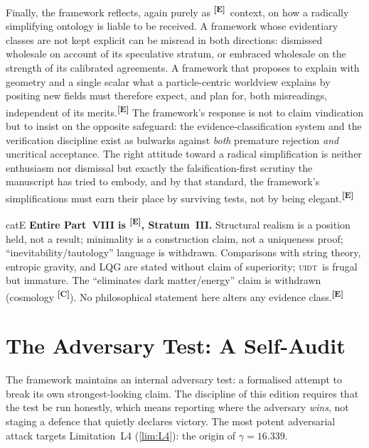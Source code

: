 \documentclass[12pt,a4paper,twoside]{article}
\theoremstyle{plain}
\theoremstyle{definition}
\theoremstyle{remark}
\newcommand{\UIDT}{\textsc{uidt}}
\newcommand{\catmark}[1]{\textsuperscript{\textsf{\textbf{[#1]}}}}
\newcommand{\GammaGeom}{16.339} %
\begin{document}
Finally, the framework reflects, again purely as \catmark{E}\ context, on how a radically simplifying ontology is liable to be received. A framework whose evidentiary classes are not kept explicit can be misread in both directions: dismissed wholesale on account of its speculative stratum, or embraced wholesale on the strength of its calibrated agreements. A framework that proposes to explain with geometry and a single scalar what a particle-centric worldview explains by positing new fields must therefore expect, and plan for, both misreadings, independent of its merits.\catmark{E} The framework's response is not to claim vindication but to insist on the opposite safeguard: the evidence-classification system and the verification discipline exist as bulwarks against \emph{both} premature rejection \emph{and} uncritical acceptance. The right attitude toward a radical simplification is neither enthusiasm nor dismissal but exactly the falsification-first scrutiny the manuscript has tried to embody, and by that standard, the framework's simplifications must earn their place by surviving tests, not by being elegant.\catmark{E}

\begin{evidencebox}{catE}
\textbf{Entire Part~VIII is \catmark{E}, Stratum~III.} Structural realism is a position held, not a result; minimality is a construction claim, not a uniqueness proof; ``inevitability/tautology'' language is withdrawn. Comparisons with string theory, entropic gravity, and LQG are stated without claim of superiority; \UIDT\ is frugal but immature. The ``eliminates dark matter/energy'' claim is withdrawn (cosmology \catmark{C}). No philosophical statement here alters any evidence class.\catmark{E}
\end{evidencebox}

\newpage
\section*{The Adversary Test: A Self-Audit}
\label{app:adversary}

\noindent The framework maintains an internal adversary test: a formalised attempt to break its own strongest-looking claim. The discipline of this edition requires that the test be run honestly, which means reporting where the adversary \emph{wins}, not staging a defence that quietly declares victory. The most potent adversarial attack targets Limitation~L4 (\cref{lim:L4}): the origin of $\gamma = \GammaGeom$.
\end{document}
